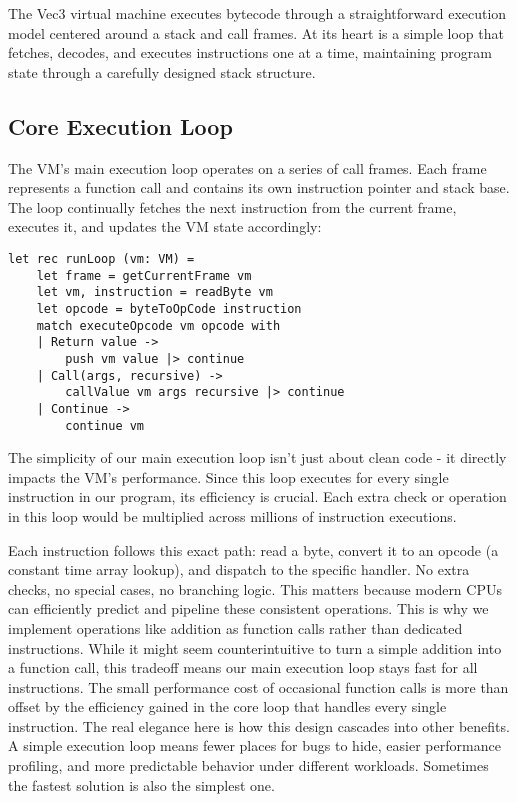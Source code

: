 The Vec3 virtual machine executes bytecode through a straightforward execution model centered around a stack and call frames. 
At its heart is a simple loop that fetches, decodes, and executes instructions one at a time, maintaining program state through a carefully designed stack structure.

\subsection{Core Execution Loop}\label{subsec:core-execution-loop}

The VM's main execution loop operates on a series of call frames.
Each frame represents a function call and contains its own instruction pointer and stack base.
The loop continually fetches the next instruction from the current frame, executes it, and updates the VM state accordingly:

\begin{verbatim}
let rec runLoop (vm: VM) =
    let frame = getCurrentFrame vm
    let vm, instruction = readByte vm
    let opcode = byteToOpCode instruction
    match executeOpcode vm opcode with
    | Return value -> 
        push vm value |> continue
    | Call(args, recursive) ->
        callValue vm args recursive |> continue
    | Continue -> 
        continue vm
\end{verbatim}

The simplicity of our main execution loop isn't just about clean code - it directly impacts the VM's performance.
Since this loop executes for every single instruction in our program, its efficiency is crucial.
Each extra check or operation in this loop would be multiplied across millions of instruction executions.

Each instruction follows this exact path: read a byte, convert it to an opcode (a constant time array lookup), and dispatch to the specific handler.
No extra checks, no special cases, no branching logic.
This matters because modern CPUs can efficiently predict and pipeline these consistent operations.
This is why we implement operations like addition as function calls rather than dedicated instructions.
While it might seem counterintuitive to turn a simple addition into a function call, this tradeoff means our main execution loop stays fast for all instructions.
The small performance cost of occasional function calls is more than offset by the efficiency gained in the core loop that handles every single instruction.
The real elegance here is how this design cascades into other benefits.
A simple execution loop means fewer places for bugs to hide, easier performance profiling, and more predictable behavior under different workloads.
Sometimes the fastest solution is also the simplest one.

